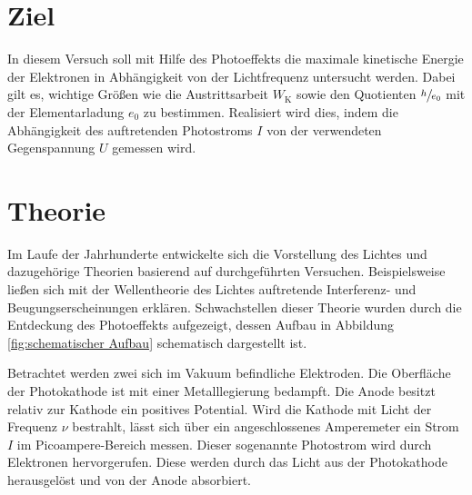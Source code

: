 \section*{Ziel}

In diesem Versuch soll mit Hilfe des Photoeffekts die maximale kinetische Energie der Elektronen in Abhängigkeit von der Lichtfrequenz untersucht werden.
Dabei gilt es, wichtige Größen wie die Austrittsarbeit $W_\mathup{K}$ sowie den Quotienten $\sfrac{h}{e_0}$ mit der Elementarladung $e_0$ zu bestimmen. 
Realisiert wird dies, indem die Abhängigkeit des auftretenden Photostroms $I$ von der verwendeten Gegenspannung $U$ gemessen wird.

\section{Theorie}
\label{sec:Theorie}

Im Laufe der Jahrhunderte entwickelte sich die Vorstellung des Lichtes und dazugehörige Theorien basierend auf durchgeführten Versuchen.
Beispielsweise ließen sich mit der Wellentheorie des Lichtes auftretende Interferenz- und Beugungserscheinungen erklären. 
Schwachstellen dieser Theorie wurden durch die Entdeckung des Photoeffekts aufgezeigt, dessen Aufbau in Abbildung \ref{fig:schematischer Aufbau}  schematisch dargestellt ist.

Betrachtet werden zwei sich im Vakuum befindliche Elektroden. 
Die Oberfläche der Photokathode ist mit einer Metalllegierung bedampft. 
Die Anode besitzt relativ zur Kathode ein positives Potential.
Wird die Kathode mit Licht der Frequenz $\nu$ bestrahlt, lässt sich über ein angeschlossenes Amperemeter ein Strom $I$ im Picoampere-Bereich messen. Dieser sogenannte Photostrom wird durch Elektronen hervorgerufen.
 Diese werden durch das Licht aus der Photokathode herausgelöst und von der Anode absorbiert. 
 
